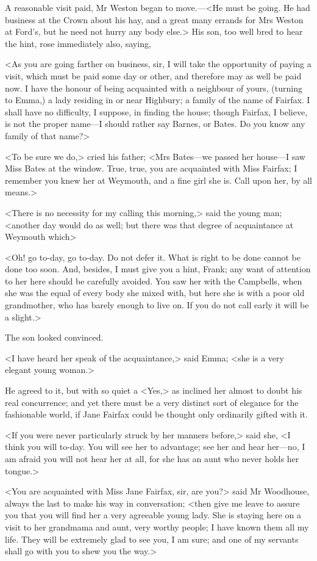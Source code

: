 A reasonable visit paid, Mr Weston began to move.—<He must be going. He had business at the Crown about his hay, and a great many errands for Mrs Weston at Ford's, but he need not hurry any body else.> His son, too well bred to hear the hint, rose immediately also, saying,

<As you are going farther on business, sir, I will take the opportunity of paying a visit, which must be paid some day or other, and therefore may as well be paid now. I have the honour of being acquainted with a neighbour of yours, (turning to Emma,) a lady residing in or near Highbury; a family of the name of Fairfax. I shall have no difficulty, I suppose, in finding the house; though Fairfax, I believe, is not the proper name—I should rather say Barnes, or Bates. Do you know any family of that name?>

<To be sure we do,> cried his father; <Mrs Bates—we passed her house—I saw Miss Bates at the window. True, true, you are acquainted with Miss Fairfax; I remember you knew her at Weymouth, and a fine girl she is. Call upon her, by all means.>

<There is no necessity for my calling this morning,> said the young man; <another day would do as well; but there was that degree of acquaintance at Weymouth which\longdash>

<Oh! go to-day, go to-day. Do not defer it. What is right to be done cannot be done too soon. And, besides, I must give you a hint, Frank; any want of attention to her here should be carefully avoided. You saw her with the Campbells, when she was the equal of every body she mixed with, but here she is with a poor old grandmother, who has barely enough to live on. If you do not call early it will be a slight.>

The son looked convinced.

<I have heard her speak of the acquaintance,> said Emma; <she is a very elegant young woman.>

He agreed to it, but with so quiet a <Yes,> as inclined her almost to doubt his real concurrence; and yet there must be a very distinct sort of elegance for the fashionable world, if Jane Fairfax could be thought only ordinarily gifted with it.

<If you were never particularly struck by her manners before,> said she, <I think you will to-day. You will see her to advantage; see her and hear her—no, I am afraid you will not hear her at all, for she has an aunt who never holds her tongue.>

<You are acquainted with Miss Jane Fairfax, sir, are you?> said Mr Woodhouse, always the last to make his way in conversation; <then give me leave to assure you that you will find her a very agreeable young lady. She is staying here on a visit to her grandmama and aunt, very worthy people; I have known them all my life. They will be extremely glad to see you, I am sure; and one of my servants shall go with you to shew you the way.>

